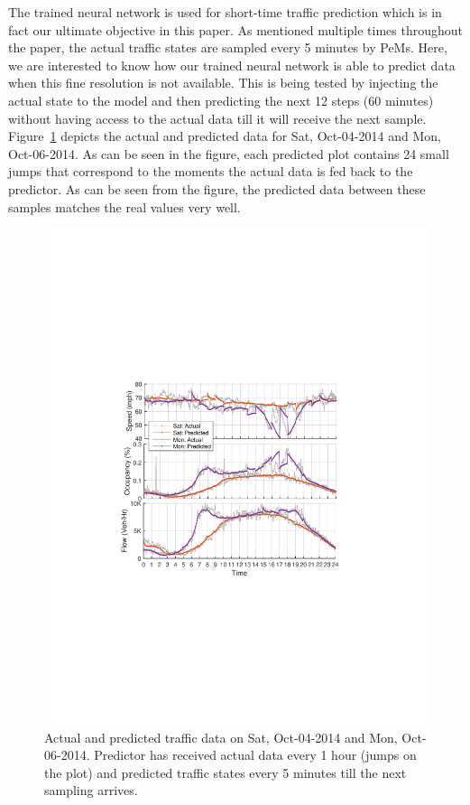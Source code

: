 \documentclass[twocolumn,10pt]{asme2e}
\begin{document}
The trained neural network is used for short-time traffic prediction which is in fact our ultimate objective in this paper. As mentioned multiple times throughout the paper, the actual traffic states are sampled every 5 minutes by PeMs. Here, we are interested to know how our trained neural network is able to predict data when this fine resolution is not available. This is being tested by injecting the actual state to the model and then predicting the next 12 steps (60 minutes) without having access to the actual data till it will receive the next sample. Figure~\ref{fig:final1} depicts the actual and predicted data for Sat, Oct-04-2014 and Mon, Oct-06-2014. As can be seen in the figure, each predicted plot contains 24 small jumps that correspond to the moments the actual data is fed back to the predictor. As can be seen from the figure, the predicted data between these samples matches the real values very well.
\begin{figure}[t]
	\centering
	\includegraphics[width=1\linewidth]{./Figures/final1}
	\caption{Actual and predicted traffic data on Sat, Oct-04-2014 and Mon, Oct-06-2014. Predictor has received actual data every 1 hour (jumps on the plot) and predicted traffic states every 5 minutes till the next sampling arrives.}
	\label{fig:final1}
\end{figure}
\end{document}
